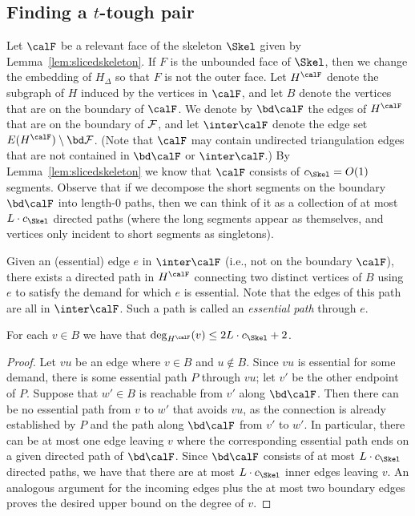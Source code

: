 \subsection{Finding a $t$-tough pair}\label{sec:gridfind}

Let $\calF$ be a relevant face of the skeleton $\Skel$ given by Lemma~\ref{lem:slicedskeleton}. If $F$ is the unbounded face of $\Skel$, then we change the embedding of $H_\Delta$ so that $F$ is not the outer face. Let $H^\calF$ denote the subgraph of $H$ induced by the vertices in $\calF$, and let $B$ denote the vertices that are on the boundary of $\calF$. We denote by $\bd \calF$ the edges of $H^\calF$ that are on the boundary of $\cal F$, and let $\inter \calF$ denote the edge set $E(H^\calF) \setminus \bd \cal F$. (Note that $\calF$ may contain undirected triangulation edges that are not contained in $\bd \calF$ or $\inter \calF$.) By Lemma~\ref{lem:slicedskeleton} we know that $\calF$ consists of $c_\Skel=O(1)$ segments. Observe that if we decompose the short segments on the boundary $\bd\calF$ into length-$0$ paths, then we can think of it as a collection of at most $L\cdot c_\Skel$ directed paths (where the long segments appear as themselves, and vertices only incident to short segments as singletons).

Given an (essential) edge $e$ in $\inter \calF$ (i.e., not on the boundary $\calF$), there exists a directed path in $H^\calF$ connecting two distinct vertices of $B$ using $e$ to satisfy the demand for which $e$ is essential. Note that the edges of this path are all in $\inter\calF$. Such a path is called an \emph{essential path} through $e$.

\begin{lemma}\label{lem:boundary_degree}
For each $v\in B$ we have that $\deg_{H^\calF}(v)\leq 2L\cdot c_\Skel+2$.
\end{lemma}

\begin{proof}
Let $vu$ be an edge where $v\in B$ and $u\not \in B$. Since $vu$ is essential for some demand, there is some essential path $P$ through $vu$; let $v'$ be the other endpoint of $P$. Suppose that $w'\in B$ is reachable from $v'$ along $\bd \calF$. Then there can be no essential path from $v$ to $w'$ that avoids $vu$, as the connection is already established by $P$ and the path along $\bd \calF$ from $v'$ to $w'$. In particular, there can be at most one edge leaving $v$ where the corresponding essential path ends on a given directed path of $\bd\calF$. Since $\bd\calF$ consists of at most $L\cdot c_\Skel$ directed paths, we have that there are at most $L\cdot c_\Skel$ inner edges leaving $v$. An analogous argument for the incoming edges plus the at most two boundary edges proves the desired upper bound on the degree of $v$.
\end{proof}

